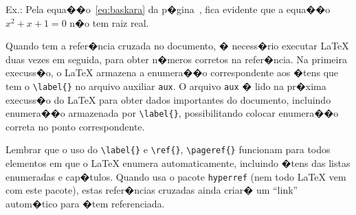\documentclass[12pt,a4paper]{article}
\begin{document}
Ex.:
 Pela equa��o~\ref{eq:baskara} da p�gina~\pageref{eq:baskara}, 
fica evidente que a  equa��o $x^2+x+1=0$ n�o tem raiz real.

Quando tem a refer�ncia cruzada no documento, � necess�rio executar 
\LaTeX{} duas vezes em seguida, para obter n�meros corretos na refer�ncia. 
Na primeira execuss�o, o \LaTeX{} armazena a enumera��o correspondente aos 
�tens que tem o \verb|\label{}| no arquivo auxiliar \verb|aux|.
O arquivo \verb|aux| � lido na pr�xima execuss�o do \LaTeX{} para obter 
dados importantes do documento, incluindo enumera��o 
armazenada por \verb|\label{}|, possibilitando colocar enumera��o correta 
no ponto correspondente.

Lembrar que o uso do \verb|\label{}| e \verb|\ref{}|, 
\verb|\pageref{}| funcionam para todos elementos em que o \LaTeX{}
enumera automaticamente, incluindo �tens das listas enumeradas e cap�tulos.
Quando usa o pacote \verb|hyperref| (nem todo \LaTeX{} vem com este pacote), 
estas refer�ncias cruzadas ainda criar� um ``link'' autom�tico para 
�tem referenciada.
\end{document}
